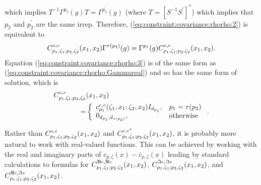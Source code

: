 which implies
$T^{-1} \Gamma^{p_2}(g) T = \Gamma^{p_2^\prime}(g)$
(where $T=[S^{-1} S^\prime]^\ast$)
which implies that $p_2$ and $p_2^\prime$ are the same irrep.
Therefore, (\ref{eq:constraint:covariance:rhorho:2}) %
is equivalent to
\begin{equation}
C_{p_1,\zeta_1;p_2,\zeta_2}^{c,c}(x_1,x_2)
\Gamma^{\tau(p_2)}(g)
=
\Gamma^{p_1}(g)
C_{p_1,\zeta_1;p_2,\zeta_2}^{c,c}(x_1,x_2)
\label{eq:constraint:covariance:rhorho:3}
.
\end{equation}
Equation (\ref{eq:constraint:covariance:rhorho:3}) %
is of the same form as
(\ref{eq:constraint:covariance:rhorho:Gammareal}) %
and so has the same
form of solution, which is
\begin{align}
C_{p_1,\zeta_1;p_2,\zeta_2}^{c,c}&(x_1,x_2)\nonumber\\
=&
\left\{
\begin{array}{ll}
c_{p_1}^{c,c}(\zeta_1,x_1;\zeta_2,x_2)
I_{d_{p_1}}
,
&
p_1=\tau(p_2)
\\
0_{d_{p_1},d_{\tau(p_2)}}
,
&
\mbox{otherwise}
\end{array}
\right.
\label{eq:Ccc:constraint:xdependent}
.
\end{align}
\par
Rather than $C_{p_1,\zeta_1;p_2,\zeta_2}^{c,c}(x_1,x_2)$ and
$C_{p_1,\zeta_1;p_2,\zeta_2}^{c,c^\ast}(x_1,x_2)$, it is probably more
natural to work with real-valued functions.
This can be achieved by working with the real and imaginary parts of
$c_{p,\zeta}(x)-\bar c_{p,\zeta}(x)$ leading by standard calculations to
formulas for
$C_{p_1,\zeta_1;p_2,\zeta_2}^{\Re c,\Re c}(x_1,x_2)$, $C_{p_1,\zeta_1;p_2,\zeta_2}^{\Im c,\Im c}(x_1,x_2)$, and $C_{p_1,\zeta_1;p_2,\zeta_2}^{\Re c,\Im c}(x_1,x_2)$.
